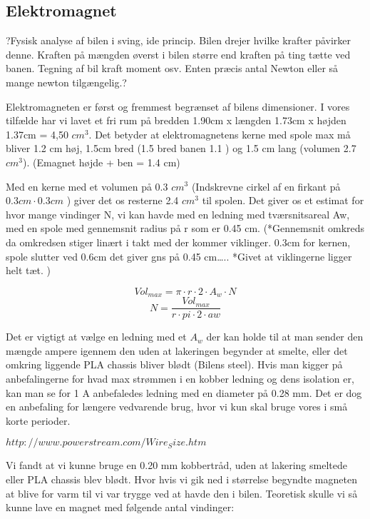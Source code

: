 
\subsection{Elektromagnet}
\label{Elektromagnet}
?Fysisk analyse af bilen i sving, ide princip. Bilen drejer hvilke krafter påvirker denne. Kraften på mængden øverst i bilen større end kraften på ting tætte ved banen. Tegning af bil kraft moment osv. Enten præcis antal Newton eller så mange newton tilgængelig.?

Elektromagneten er først og fremmest begrænset af bilens dimensioner. I vores tilfælde har vi lavet et fri rum på bredden 1.90cm x længden 1.73cm x højden 1.37cm = 4,50 $cm^3$. 
Det betyder at elektromagnetens kerne med spole max må bliver 1.2 cm høj, 1.5cm bred (1.5  bred banen 1.1 ) og 1.5 cm lang (volumen 2.7 $cm^3$). (Emagnet højde + ben = 1.4 cm)

Med en kerne med et volumen på 0.3 $cm^3$ (Indskrevne cirkel af en firkant på $0.3cm \cdot 0.3 cm$ ) giver det os resterne 2.4 $cm^3$ til spolen.
Det giver os et estimat for hvor mange vindinger N, vi kan havde med en ledning med tværsnitsareal Aw, med en spole med gennemsnit radius på r som er 0.45 cm. (*Gennemsnit omkreds da omkredsen stiger linært i takt med der kommer viklinger. 0.3cm for kernen, spole slutter ved 0.6cm det giver gns på 0.45 cm….. *Givet at viklingerne ligger helt tæt. )


\begin{equation}
Vol_{max} =\pi \cdot r \cdot 2 \cdot A_w \cdot N 
\end{equation}
\begin{equation}
N= \frac{Vol_{max}}{r \cdot pi \cdot 2 \cdot aw}
\end{equation}

Det er vigtigt at vælge en ledning med et $A_{w}$ der kan holde til at man sender den mængde ampere igennem den uden at lakeringen begynder at smelte, eller det omkring liggende PLA chassis bliver blødt (Bilens steel). 
Hvis man kigger på anbefalingerne for hvad max strømmen i en kobber ledning og dens isolation er, kan man se for 1 A anbefaledes ledning med en diameter på 0.28 mm. Det er dog en anbefaling for længere vedvarende brug, hvor vi kun skal bruge vores i små korte perioder.

$http://www.powerstream.com/Wire_Size.htm $

Vi fandt at vi kunne bruge en 0.20 mm kobbertråd, uden at lakering smeltede eller PLA chassis blev blødt. Hvor hvis vi gik ned i størrelse begyndte magneten at blive for varm til vi var trygge ved at havde den i bilen.
Teoretisk skulle vi så kunne lave en magnet med følgende antal vindinger:

